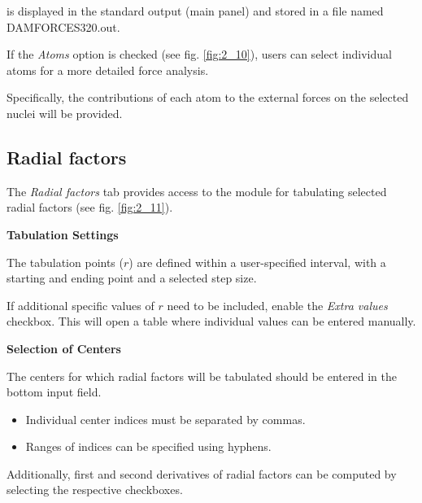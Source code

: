 \documentclass[10pt]{article}
\begin{document}
is displayed in the standard output (main panel)
and stored in a file named DAMFORCES320.out.

If the {\it Atoms} option is checked (see fig. \ref{fig:2_10}),
users can select individual atoms for a more detailed force analysis.

Specifically, the contributions of each atom
to the external forces on the selected nuclei will be provided.


\subsection{Radial factors \label{sec:2.11}}

The {\it Radial factors} tab provides access to the module
for tabulating selected radial factors (see fig. \ref{fig:2_11}).

\vspace*{3mm}
{\bf Tabulation Settings}
\vspace*{3mm}

The tabulation points ($r$) are defined within a user-specified interval,
with a starting and ending point and a selected step size.

If additional specific values of $r$ need to be included,
enable the {\it Extra values} checkbox.
This will open a table where individual values can be entered manually.

\vspace*{3mm}
{\bf Selection of Centers}
\vspace*{3mm}

The centers for which radial factors will be tabulated
should be entered in the bottom input field.

\begin{itemize}
\item Individual center indices must be separated by commas.
\item Ranges of indices can be specified using hyphens.
\end{itemize}

Additionally, first and second derivatives of radial factors
can be computed by selecting the respective checkboxes.
\end{document}
